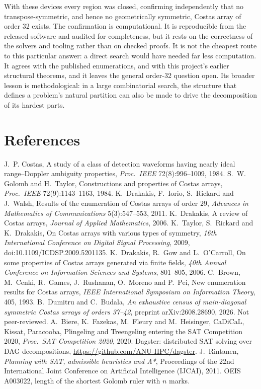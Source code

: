 \documentclass[11pt,a4paper,oneside]{report}
\makeatletter
\theoremstyle{definition}
\newenvironment{paperrefs}{\section*{References}\list{\@biblabel{\@arabic\c@enumiv}}{\settowidth\labelwidth{\@biblabel{99}}\leftmargin\labelwidth\advance\leftmargin\labelsep\usecounter{enumiv}\let\p@enumiv\@empty\renewcommand\theenumiv{\@arabic\c@enumiv}}\sloppy\small}{\endlist}
\makeatother
\begin{document}
With these devices every region was closed, confirming independently that no transpose-symmetric,
and hence no geometrically symmetric, Costas array of order 32 exists. The confirmation is computational. It is
reproducible from the released software and audited for completeness, but it rests on the
correctness of the solvers and tooling rather than on checked proofs. It is not the cheapest route
to this particular answer: a direct search would have needed far less computation. It agrees with the published enumerations,
and with this project's earlier structural theorems, and it leaves the general order-32 question
open. Its broader lesson is methodological: in a large combinatorial search, the structure that
defines a problem's natural partition can also be made to drive the decomposition of its hardest
parts.



\begin{paperrefs}
J.~P. Costas, A study of a class of detection waveforms having nearly ideal range--Doppler
ambiguity properties, \emph{Proc.\ IEEE} 72(8):996--1009, 1984.
S.~W. Golomb and H.~Taylor, Constructions and properties of Costas arrays, \emph{Proc.\ IEEE}
72(9):1143--1163, 1984.
K.~Drakakis, F.~Iorio, S.~Rickard and J.~Walsh, Results of the enumeration of Costas arrays of
order 29, \emph{Advances in Mathematics of Communications} 5(3):547--553, 2011.
K.~Drakakis, A review of Costas arrays, \emph{Journal of Applied Mathematics}, 2006.
K.~Taylor, S.~Rickard and K.~Drakakis, On Costas arrays with various types of symmetry,
\emph{16th International Conference on Digital Signal Processing}, 2009,
doi:10.1109/ICDSP.2009.5201135.
K.~Drakakis, R.~Gow and L.~O'Carroll, On some properties of Costas arrays generated via finite
fields, \emph{40th Annual Conference on Information Sciences and Systems}, 801--805, 2006.
C.~Brown, M.~Cenki, R.~Games, J.~Rushanan, O.~Moreno and P.~Pei, New enumeration results for
Costas arrays, \emph{IEEE International Symposium on Information Theory}, 405, 1993.
 B.~Dumitru and C.~Budala, \emph{An exhaustive census of main-diagonal symmetric Costas arrays of orders 37--42}, preprint arXiv:2608.28690, 2026. Not peer-reviewed.
A.~Biere, K.~Fazekas, M.~Fleury and M.~Heisinger, CaDiCaL, Kissat, Paracooba, Plingeling and
Treengeling entering the SAT Competition 2020, \emph{Proc.\ SAT Competition 2020}, 2020.
Dagster: distributed SAT solving over DAG decompositions, \url{https://github.com/ANU-HPC/dagster}.
 J.~Rintanen, \emph{Planning with SAT, admissible heuristics and A*}, Proceedings of the 22nd International Joint Conference on Artificial Intelligence (IJCAI), 2011.
 OEIS A003022, length of the shortest Golomb ruler with $n$ marks.
\end{paperrefs}
\end{document}
